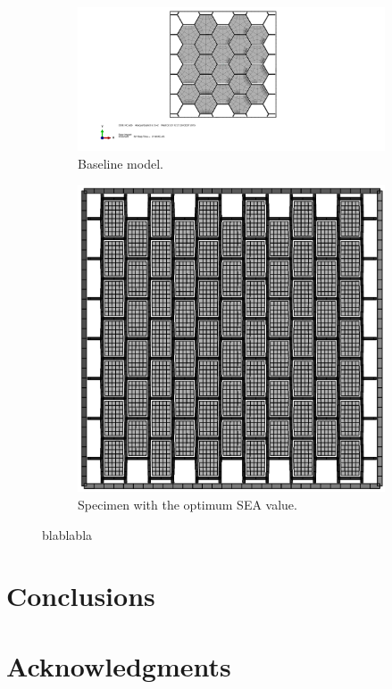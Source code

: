 \documentclass[cmfonts]{witpress}
\begin{document}
\begin{figure}[htpb]
\begin{subfigure}[b]{.45\columnwidth}
   \includegraphics[width=\columnwidth]{figures/IMG/sc1.pdf}
    \caption{Baseline model.}
    \label{fig:back0}
\end{subfigure}
\qquad
\begin{subfigure}[b]{.45\columnwidth}
   \includegraphics[width=\columnwidth]{figures/IMG/topview.png}
    \caption{Specimen with the optimum SEA value.}
    \label{fig:back5}
\end{subfigure}
\caption{blablabla}
\label{fig:opt_comparison}
\end{figure}


\section{Conclusions}
\section{Acknowledgments}




\end{document}
